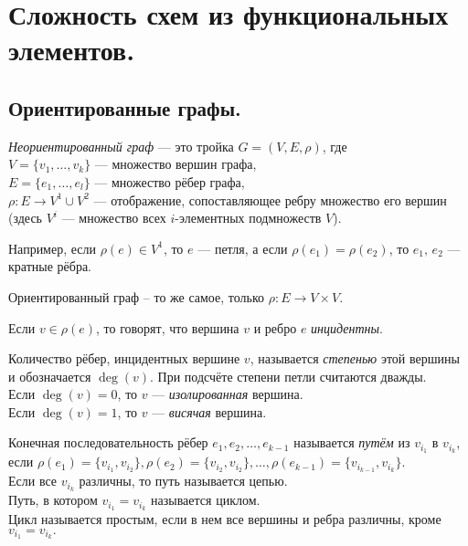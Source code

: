 \section{Сложность схем из функциональных элементов.}
\subsection{Ориентированные графы.}
\begin{df} 
\textit{Неориентированный граф} --- это тройка $G = (V, E, \rho)$, где\\
$V = \{v_1, \dots, v_k\}$ --- множество вершин графа,\\
$E = \{e_1, \dots, e_l\}$ --- множество рёбер графа,\\ 
$\rho\colon E \rightarrow V^1 \cup V^2$ --- отображение, сопоставляющее ребру множество его вершин (здесь $V^i$ --- множество всех $i$-элементных подмножеств $V$).
\end{df}
\noindent Например, если $\rho(e) \in V^1$, то $e$ --- петля, а если $\rho(e_1) = \rho(e_2)$, то $e_1,\,e_2$ --- кратные рёбра.

\begin{df}
Ориентированный граф -- то же самое, только $\rho: E \rightarrow V \times V$.
\end{df}

\begin{df}
Если $v\in \rho(e)$, то говорят, что вершина $v$ и ребро $e$ \textit{инцидентны}.
\end{df}

\begin{df}
Количество рёбер, инцидентных вершине $v$, называется \textit{степенью} этой вершины и обозначается $\deg(v)$. При подсчёте степени петли считаются дважды.\\
Если $\deg(v) = 0$, то $v$ --- \textit{изолированная} вершина.\\
Если $\deg(v) = 1$, то $v$ --- \textit{висячая} вершина.
\end{df}

\begin{df}
Конечная последовательность рёбер $e_1, e_2, \ldots, e_{k-1}$ называется \textit{путём} из $v_{i_1}$ в $v_{i_k}$, если $\rho(e_1) = \{v_{i_1}, v_{i_2}\},\rho(e_2) = \{v_{i_2}, v_{i_2}\} , \ldots, \rho(e_{k-1}) = \{v_{i_{k-1}}, v_{i_k}\}$.\\
Если все $v_{i_k}$ различны, то путь называется цепью.\\
Путь, в котором $v_{i_1} = v_{i_k}$ называется циклом.\\
Цикл называется простым, если в нем все вершины и ребра различны, кроме $v_{i_1} = v_{i_k}.$
\end{df}


